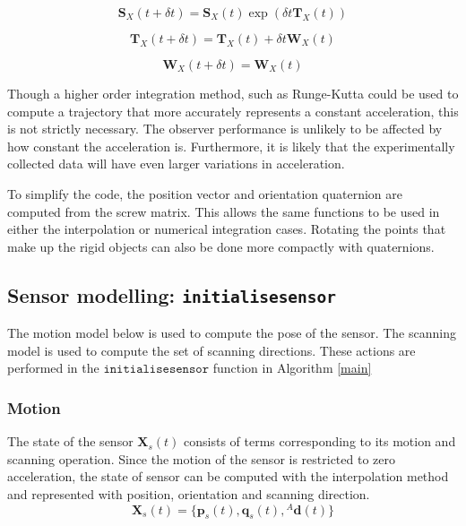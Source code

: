\begin{equation}
	\mathbf{S}_X(t+\delta t) = \mathbf{S}_X(t)\exp({\delta t {\mathbf{T}_X(t)}})
\end{equation}

\begin{equation}
	\mathbf{T}_X(t+\delta t) = \mathbf{T}_X(t) + \delta t \mathbf{W}_X(t)
\end{equation}

\begin{equation}
	\mathbf{W}_X(t+\delta t) =\mathbf{W}_X(t)
\end{equation}

Though a higher order integration method, such as Runge-Kutta could be used to compute a trajectory that more accurately represents a constant acceleration, this is not strictly necessary. The observer performance is unlikely to be affected by how constant the acceleration is. Furthermore, it is likely that the experimentally collected data will have even larger variations in acceleration.

To simplify the code, the position vector and orientation quaternion are computed from the screw matrix. This allows the same functions to be used in either the interpolation or numerical integration cases. Rotating the points that make up the rigid objects can also be done more compactly with quaternions.

\subsection{Sensor modelling: \texttt{initialisesensor}}
The motion model below is used to compute the pose of the sensor. The scanning model is used to compute the set of scanning directions. These actions are performed in the $\texttt{initialisesensor}$ function in Algorithm \ref{main}
\subsubsection{Motion}
The state of the sensor $\mathbf{X}_{s}(t)$ consists of terms corresponding to its motion and scanning operation. Since the motion of the sensor is restricted to zero acceleration, the state of sensor can be computed with the interpolation method and represented with position, orientation and scanning direction. 
\begin{equation}
	\mathbf{X}_{s}(t) = \{\mathbf{p}_s(t),\mathbf{q}_s(t),{^{A}\mathbf{d}(t)}\}
\end{equation}


